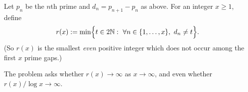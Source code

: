 Let $p_n$ be the $n$th prime and $d_n=p_{n+1}-p_n$ as above. For an integer $x\ge 1$, define
\[
  r(x):= \min\Bigl\{ t\in 2\mathbb{N}:\ \forall n\in\{1,\dots,x\},\ d_n\ne t\Bigr\}.
\]
(So $r(x)$ is the smallest \emph{even} positive integer which does not occur among the first $x$ prime gaps.)

The problem asks whether $r(x)\to\infty$ as $x\to\infty$, and even whether $r(x)/\log x\to\infty$.
